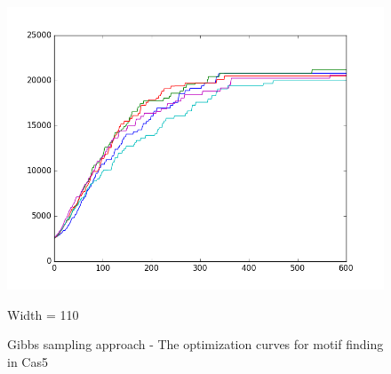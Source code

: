 \documentclass[11pt, oneside]{article}
\begin{document}
\begin{figure}[htbp]
\begin{minipage}{0.32\textwidth}
  \end{minipage}
  \hfill
  \begin{minipage}{0.32\textwidth}
    \centering
    \includegraphics[width=1\textwidth]{images/cas5_width110_curve} %
    \caption*{Width = 110}
  \end{minipage}
  \caption{Gibbs sampling approach - The optimization curves for motif finding in Cas5}
  \label{fig:cas5}
\end{figure}
\end{document}
